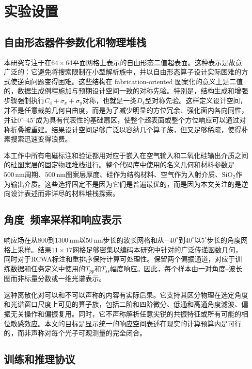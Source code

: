 \section{实验设置}

\subsection{自由形态器件参数化和物理堆栈}

本研究专注于在$64\times64$平面网格上表示的自由形态二值超表面。这种表示是故意广泛的：它避免将搜索限制在小型解析族中，并以自由形态算子设计实际困难的方式使逆向问题变得困难。这些结构在 fabrication-oriented 图案化的意义上是二值的，数据生成例程施加与预期设计空间一致的对称先验。特别是，结构生成和增强步骤强制执行$C_4+\sigma_x+\sigma_y$对称，也就是一类$D_4$型对称先验。这样定义设计空间，并不是任意裁剪几何自由度，而是为了减少明显的方位冗余、强化面内各向同性，并让$0^{\circ}$--$45^{\circ}$成为具有代表性的基础扇区，使整个超表面或整个方位响应可以通过对称折叠被重建。结果设计空间足够广泛以容纳几个算子族，但又足够稀疏，使得朴素搜索迅速变得浪费。

本工作中所有电磁标注和验证都用对应于嵌入在空气输入和二氧化硅输出介质之间的硅图案层的固定物理堆栈进行。整个代码库中使用的名义几何和材料参数是$500\,\mathrm{nm}$周期、$500\,\mathrm{nm}$图案层厚度、硅作为结构材料、空气作为入射介质、$\mathrm{SiO}_2$作为输出介质。这些选择固定不是因为它们是普遍最优的，而是因为本文关注的是逆向设计表述而非详尽的材料堆栈探索。

\subsection{角度--频率采样和响应表示}

响应场在从$800$到$1300\,\mathrm{nm}$以$50\,\mathrm{nm}$步长的波长网格和从$-40^{\circ}$到$40^{\circ}$以$5^{\circ}$步长的角度网格上采样。结果$11\times17$网格足够密集以编码本研究中针对的广泛传递函数几何，同时对于RCWA标注和重排序保持计算可处理性。保留两个偏振通道，对应于训练数据和任务定义中使用的$T_{pp}$和$T_{ss}$幅度响应。因此，每个样本由一对角度--波长图而非标量分数或一维光谱表示。

这种离散化对可以和不可以声称的内容有实际后果。它支持其区分物理在选定角度和光谱窗口尺度上可见的算子族，包括二阶和四阶微分、低通和高通角度滤波、偏振无关操作和偏振复用。同时，它不声称解析任意尖锐的共振特征或所有可能的相位敏感效应。本文的目标是显示统一的响应空间表述在现实的计算预算内是可行的，而非声称对每个光子可观测量的完全闭合。

\subsection{训练和推理协议}

